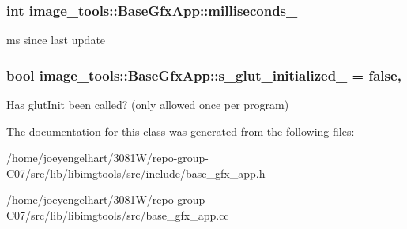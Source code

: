 \subsubsection[{\texorpdfstring{milliseconds\+\_\+}{milliseconds_}}]{\setlength{\rightskip}{0pt plus 5cm}int image\+\_\+tools\+::\+Base\+Gfx\+App\+::milliseconds\+\_\+\hspace{0.3cm}{\ttfamily [private]}}\hypertarget{classimage__tools_1_1BaseGfxApp_a2197d887035883be911d1ced510d99d9}{}\label{classimage__tools_1_1BaseGfxApp_a2197d887035883be911d1ced510d99d9}
ms since last update 
\subsubsection[{\texorpdfstring{s\+\_\+glut\+\_\+initialized\+\_\+}{s_glut_initialized_}}]{\setlength{\rightskip}{0pt plus 5cm}bool image\+\_\+tools\+::\+Base\+Gfx\+App\+::s\+\_\+glut\+\_\+initialized\+\_\+ = false\hspace{0.3cm}{\ttfamily [static]}, {\ttfamily [private]}}\hypertarget{classimage__tools_1_1BaseGfxApp_a4bfe294b3c2987edd8e8465e4047a064}{}\label{classimage__tools_1_1BaseGfxApp_a4bfe294b3c2987edd8e8465e4047a064}
Has glut\+Init been called? (only allowed once per program) 

The documentation for this class was generated from the following files\+:\begin{DoxyCompactItemize}
\item 
/home/joeyengelhart/3081\+W/repo-\/group-\/\+C07/src/lib/libimgtools/src/include/base\+\_\+gfx\+\_\+app.\+h\item 
/home/joeyengelhart/3081\+W/repo-\/group-\/\+C07/src/lib/libimgtools/src/base\+\_\+gfx\+\_\+app.\+cc\end{DoxyCompactItemize}
